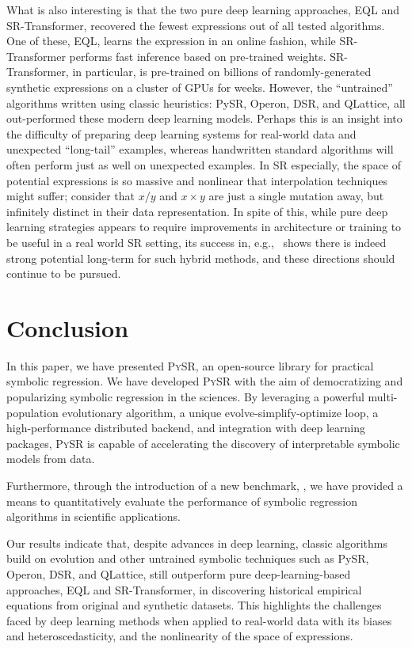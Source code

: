 \documentclass[letterpaper,twocolumn]{scrartcl}
\newcommand\pysr{\textsc{PySR}\xspace}
\begin{document}
\begin{linenumbers}
What is also interesting is that the two pure deep learning approaches, EQL and SR-Transformer, recovered the fewest expressions out of all tested algorithms.
One of these, EQL, learns the expression in an online fashion, while SR-Transformer performs fast inference based on pre-trained weights.
SR-Transformer, in particular, is pre-trained on billions of randomly-generated synthetic expressions on a cluster of GPUs for weeks.
However, the ``untrained'' algorithms written using classic heuristics: PySR, Operon, DSR, and QLattice, all out-performed these modern deep learning models. 
Perhaps this is an insight into the difficulty of preparing deep learning systems for real-world data and unexpected ``long-tail'' examples, whereas handwritten standard algorithms will often perform just as well on unexpected examples.  In SR especially, the space of potential expressions is so massive and nonlinear that interpolation techniques might suffer; consider that $x/y$ and $x\times y$ are just a single mutation away, but infinitely distinct in their data representation.
In spite of this, while pure deep learning strategies appears to require improvements in architecture or training to be useful in a real world SR setting, its success in, e.g.,~\cite{cranmerDiscoveringSymbolicModels2020,petersenDeepSymbolicRegression2021,kamiennyEndtoendSymbolicRegression2022} shows there is indeed strong potential long-term for such hybrid methods, and these directions should continue to be pursued.


\section{Conclusion}

In this paper, we have presented \pysr, an open-source library for practical symbolic regression.
We have developed \pysr with the aim of democratizing and popularizing symbolic regression in the sciences.
By leveraging a powerful multi-population evolutionary algorithm, a unique evolve-simplify-optimize loop, a high-performance distributed backend, and integration with deep learning packages, \pysr is capable of accelerating the discovery of interpretable symbolic models from data.

Furthermore, through the introduction of a new benchmark, \bench, we have provided a means to quantitatively evaluate the performance of symbolic regression algorithms in scientific applications.

Our results indicate that, despite advances in deep learning, classic algorithms build on evolution and other untrained symbolic techniques such as PySR, Operon, DSR, and QLattice, still outperform pure deep-learning-based approaches, EQL and SR-Transformer, in discovering historical empirical equations from original and synthetic datasets.
This highlights the challenges faced by deep learning methods when applied to real-world data with its biases and heteroscedasticity, and the nonlinearity of the space of expressions.


\end{linenumbers}
\end{document}
